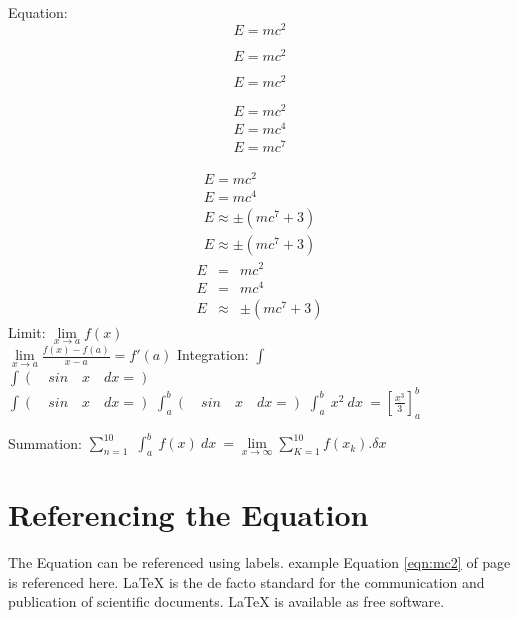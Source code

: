 Equation:
\begin{equation} %
E=mc^2 
\end{equation}

\begin{equation*}
E=mc^2 
\end{equation*}

\[
E=mc^2
\]

\begin{eqnarray}
E=mc^2 \label{eqn:mc2} \\ %
E=mc^4\\
E=mc^7 
\end{eqnarray}

\begin{eqnarray*}
E=mc^2 \\
E=mc^4\\
E \approx \pm (mc^7 +3)\\
E \approx \pm (mc^7 +3)
\end{eqnarray*}
\begin{eqnarray}
E &=& mc^2 \\
E &=& mc^4 \nonumber \\
E &\approx& \pm (mc^7 +3)
\end{eqnarray}
Limit:
$\lim \limits_{x \to a} f(x)$\\
$\lim \limits_{x \to a} \frac{f(x)-f(a)}{x-a}=f'(a)$
Integration:
$\int$\\
$\int(\quad sin\quad x\quad dx= ) $\\
$\displaystyle{\int(\quad sin\quad x\quad dx= )} $
$\displaystyle{\int^b_a(\quad sin\quad x\quad dx= )} $
$\displaystyle{\int^b_a\: x^2\: dx\:=\left[\frac{x^3}{3}\right]^b_a} $


Summation:
$\displaystyle{\sum_{n=1}^{10}}$
$\displaystyle{\int^b_a\: f(x)\: dx\:=\lim \limits_{x \to \infty}\displaystyle{\sum_{K=1}^{10}f(x_k).\delta x}} $

\section{Referencing the Equation}
The Equation can be referenced using labels. example Equation \ref{eqn:mc2} of page \pageref{eqn:mc2} is referenced here.
LaTeX is the de facto standard for the communication and publication of scientific documents. LaTeX is available as free software.

